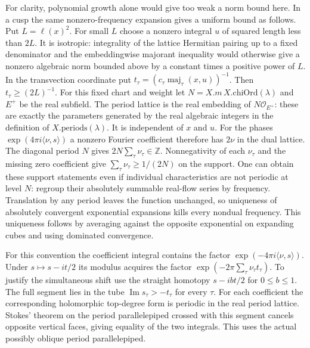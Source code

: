 For clarity, polynomial growth alone would give too weak a norm
bound here. In a cusp the same nonzero-frequency expansion gives a
uniform bound as follows. Put $L=\ell(x)^2$. For small $L$ choose
a nonzero integral $u$ of squared length less than $2L$. It is
isotropic: integrality of the lattice Hermitian pairing up to a
fixed denominator and the embeddingwise majorant inequality would
otherwise give a nonzero algebraic norm bounded above by
a constant times a positive power of $L$. In the transvection
coordinate put $t_\tau=(c_\tau\operatorname{maj}_\tau(x,u))^{-1}$.
Then $t_\tau\ge (2L)^{-1}$. For this fixed chart and weight let
$N=X.m\,X.\mathrm{chiOrd}(\lambda)$ and $E^+$ be the real subfield.
The period lattice is the real embedding of $N\mathcal O_{E^+}$:
these are exactly the parameters generated by the real algebraic
integers in the definition of $X.\mathrm{periods}(\lambda)$.
It is independent of $x$ and $u$. For the phases
$\exp(4\pi i\langle\nu,s\rangle)$ a nonzero Fourier coefficient
therefore has $2\nu$ in the dual lattice. The diagonal period $N$
gives $2N\sum_\tau\nu_\tau\in\mathbb Z$. Nonnegativity of each
$\nu_\tau$ and the missing zero coefficient give
$\sum_\tau\nu_\tau\ge1/(2N)$ on the support. One can obtain these
support statements even if individual characteristics are not
periodic at level $N$: regroup their absolutely summable real-flow
series by frequency. Translation by any period leaves the function
unchanged, so uniqueness of absolutely convergent exponential
expansions kills every nondual frequency. This uniqueness follows by
averaging against the opposite exponential on expanding cubes and
using dominated convergence.

For this convention the coefficient integral contains the factor
$\exp(-4\pi i\langle\nu,s\rangle)$. Under
$s\mapsto s-i t/2$ its modulus acquires the factor
$\exp(-2\pi\sum_\tau\nu_\tau t_\tau)$. To justify the simultaneous
shift use the straight homotopy $s-i b t/2$ for $0\le b\le1$.
The full segment lies in the tube
$\operatorname{Im}s_\tau>-t_\tau$ for every $\tau$. For each
coefficient the corresponding holomorphic top-degree form is
periodic in the real period lattice. Stokes' theorem on the
period parallelepiped crossed with this segment cancels opposite
vertical faces, giving equality of the two integrals. This uses
the actual possibly oblique period parallelepiped.

